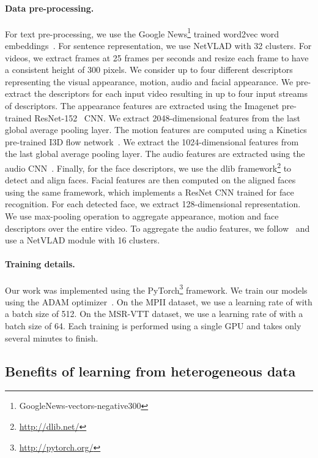 \documentclass[runningheads]{llncs}
\begin{document}
\paragraph{Data pre-processing.}
For text pre-processing, we use the Google News\footnote{GoogleNews-vectors-negative300} trained word2vec word embeddings~\cite{mikolov13efficient}. For sentence representation, we use NetVLAD \cite{arandjelovic16netvlad} with 32 clusters. For videos, we extract frames at 25 frames per seconds and resize each frame to have a consistent height of 300 pixels. 
We consider up to four different descriptors representing the visual appearance, motion, audio and facial appearance.
We pre-extract the descriptors for each input video resulting in up to four input streams of descriptors. 
The appearance features are extracted using the Imagenet pre-trained ResNet-152~\cite{he16resnet} CNN. We extract 2048-dimensional features from the last global average pooling layer. The motion features are computed using a Kinetics pre-trained I3D flow network~\cite{carreira2017quovadis}. We extract the 1024-dimensional features from the last global average pooling layer. 
The audio features are extracted using the audio CNN~\cite{hershey17cnn}. 
Finally, for the face descriptors, we use the dlib framework\footnote{\url{http://dlib.net/}} to detect and align faces. Facial features are then computed on the aligned faces using the same framework, which implements a ResNet CNN trained for face recognition. For each detected face, we extract 128-dimensional representation. 
We use max-pooling operation to aggregate appearance, motion and face descriptors over the entire video. To aggregate the audio features, we follow~\cite{miech17learnable} and use a NetVLAD module with 16 clusters. 

\paragraph{Training details.}
Our work was implemented using the PyTorch\footnote{\url{http://pytorch.org/}} framework. We train our models using the ADAM optimizer~\cite{kingma15adam}. On the MPII dataset, we use a learning rate of  with a batch size of 512. On the MSR-VTT dataset, we use a learning rate of  with a batch size of 64. Each training is performed using a single GPU and takes only several minutes to finish. 



\subsection{Benefits of learning from heterogeneous data}
\end{document}
